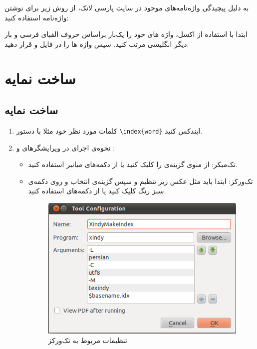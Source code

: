 به دلیل پیچیدگی واژه‌نامه‌های موجود در سایت پارسی لاتک، از روش زیر برای نوشتن واژه‌نامه استفاده کنید:

ابتدا با استفاده از اکسل، واژه های خود را یک‌بار براساس حروف الفبای فرسی و بار دیگر انگلیسی مرتب کنید. سپس واژه ها را در فایل  و  قرار دهید.

\section{ساخت نمایه}\label{Namaye}
\subsection{ساخت نمایه}
 \begin{enumerate}

\item
کلمات مورد نظر خود مثلا  با دستور \verb|\index{word}| ایندکس کنید.
\item
نحوه‌ی اجرای    در ویرایشگرهای  و :
\begin{itemize}
\item  تک‌میکر: از منوی  گزینه‌ی  را کلیک کنید یا از دکمه‌‌های میانبر  استفاده کنید.

\item  تک‌ورکز: ابتدا باید مثل عکس زیر تنظیم  و سپس گزینه‌ی   انتخاب و روی دکمه‌ی سبز رنگ کلیک کنید یا از دکمه‌های   استفاده کنید.

\begin{figure}[!h]
\centerline{\includegraphics[width=.5\textwidth]{Xindy_Make_Index.png}}
\caption{تنظیمات مربوط به تک‌ورکز}
\end{figure}

\end{itemize}
 \end{enumerate}
 

